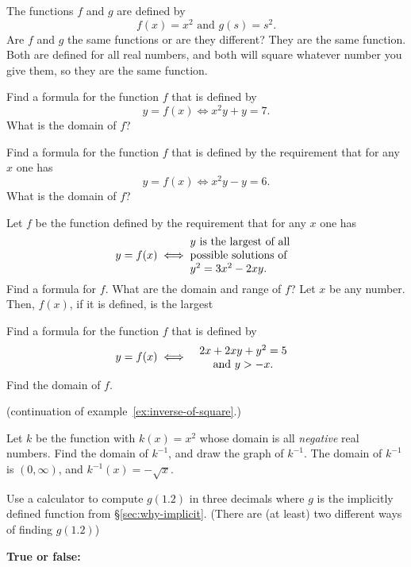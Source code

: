 \begin{multicols}{2}\setlength{\parindent}{0pt}
\problem The functions $f$ and $g$ are defined by
\[
f(x) = x^2 \text{ and } g(s) = s^2.
\]
Are $f$ and $g$ the same functions or are they different?
\answer
They are the same function.  Both are defined for all real numbers,
and both will square whatever number you give them, so they are the
same function.
\endanswer


\problem Find a formula for the function $f$ that is defined by
\[
y=f(x) \iff x^2y+y = 7.
\]
What is the domain of $f$?


\problem Find a formula for the function $f$ that is defined by the
requirement that for any $x$ one has
\[
y=f(x) \iff x^2y-y = 6.
\]
What is the domain of $f$?


\problem Let $f$ be the function defined by the requirement that for
any $x$ one has
\[
y=f(x) \iff \parbox{96pt}{\raggedright$y$ is the largest of all\\
possible solutions of\\ $y^2 = 3x^2-2xy$.}
\]
Find a formula for $f$.  What are the domain and range of $f$?
\answer
Let $x$ be any number.  Then, $f(x)$, if it is defined, is the largest

\endanswer


\problem Find a formula for the function $f$ that is defined by
\[
y=f(x) \iff 
\parbox{96pt}{\centering$2x+2xy+y^2 = 5$\\ and  $y>-x$.}
\]
Find the domain of $f$.

\problem\label{ex:inverse-of-square}
(continuation of example~\ref{ex:inverse-of-square}.)

Let $k$ be the function with $k(x) = x^2$ whose domain is all \textit{negative}
real numbers. Find the domain of $k^{-1}$, and draw the graph of $k^{-1}$.
\answer
The domain of $k^{-1} $ is $(0, \infty)$, and $k^{-1}(x) = -\sqrt{x}$.
\endanswer

\problem Use a calculator to compute $g(1.2)$ in three decimals where $g$
is the implicitly defined function from \S\ref{sec:why-implicit}.  (There
are (at least) two different ways of finding $g(1.2)$)


\problem \label{ex:01sine-of-arcsine} \groupproblem
\textbf{True or false:}


\end{multicols}
